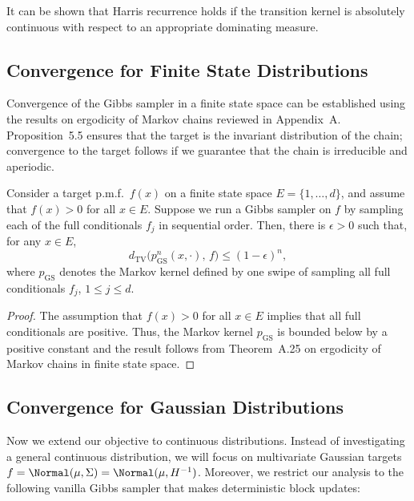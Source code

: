 \begin{remark}
\label{rem:5.9}
It can be shown that Harris recurrence holds if the transition kernel is absolutely continuous
with respect to an appropriate dominating measure.
\end{remark}

\subsection{Convergence for Finite State Distributions}
\label{sec:5.3.1}

Convergence of the Gibbs sampler in a finite state space can be established using the results on
ergodicity of Markov chains reviewed in Appendix~A. Proposition~5.5 ensures that the target is
the invariant distribution of the chain; convergence to the target follows if we guarantee that
the chain is irreducible and aperiodic.

\begin{theorem}
\label{thm:5.10}
Consider a target p.m.f.\ $f(x)$ on a finite state space $E = \{1, \ldots, d\}$, and assume
that $f(x) > 0$ for all $x \in E$. Suppose we run a Gibbs sampler on $f$ by sampling each of
the full conditionals $f_j$ in sequential order. Then, there is $\epsilon > 0$ such that, for
any $x \in E$,
\[
  d_{\mathrm{TV}}\bigl(p_{\mathrm{GS}}^n(x, \cdot),\, f\bigr) \le (1 - \epsilon)^n,
\]
where $p_{\mathrm{GS}}$ denotes the Markov kernel defined by one swipe of sampling all full
conditionals $f_j$, $1 \le j \le d$.
\end{theorem}

\begin{proof}
The assumption that $f(x) > 0$ for all $x \in E$ implies that all full conditionals are
positive. Thus, the Markov kernel $p_{\mathrm{GS}}$ is bounded below by a positive constant and
the result follows from Theorem~A.25 on ergodicity of Markov chains in finite state space.
\end{proof}

\subsection{Convergence for Gaussian Distributions}
\label{sec:5.3.2}

Now we extend our objective to continuous distributions. Instead of investigating a general
continuous distribution, we will focus on multivariate Gaussian targets
$f = \Normal(\mu, \Sigma) = \Normal(\mu, H^{-1})$. Moreover, we restrict our analysis to the
following vanilla Gibbs sampler that makes deterministic block updates:

